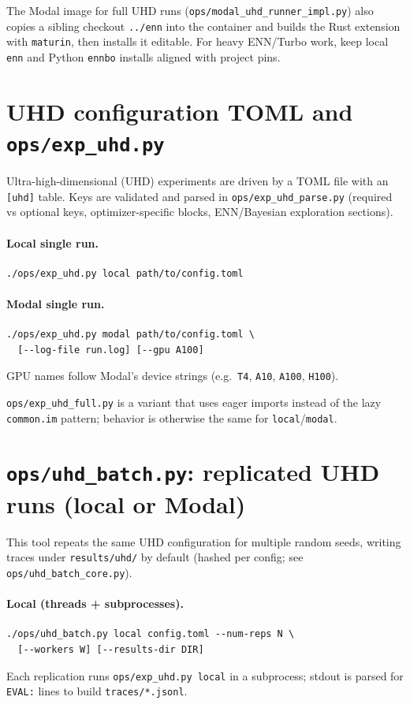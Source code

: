 \documentclass[11pt]{article}
\begin{document}
The Modal image for full UHD runs (\texttt{ops/modal\_uhd\_runner\_impl.py}) also copies a sibling checkout \texttt{../enn} into the container and builds the Rust extension with \texttt{maturin}, then installs it editable. For heavy ENN/Turbo work, keep local \texttt{enn} and Python \texttt{ennbo} installs aligned with project pins.

\section{UHD configuration TOML and \texttt{ops/exp\_uhd.py}}
Ultra-high-dimensional (UHD) experiments are driven by a TOML file with an \texttt{[uhd]} table. Keys are validated and parsed in \texttt{ops/exp\_uhd\_parse.py} (required vs optional keys, optimizer-specific blocks, ENN/Bayesian exploration sections).

\paragraph{Local single run.}
\begin{verbatim}
./ops/exp_uhd.py local path/to/config.toml
\end{verbatim}

\paragraph{Modal single run.}
\begin{verbatim}
./ops/exp_uhd.py modal path/to/config.toml \
  [--log-file run.log] [--gpu A100]
\end{verbatim}
GPU names follow Modal's device strings (e.g.\ \texttt{T4}, \texttt{A10}, \texttt{A100}, \texttt{H100}).

\texttt{ops/exp\_uhd\_full.py} is a variant that uses eager imports instead of the lazy \texttt{common.im} pattern; behavior is otherwise the same for \texttt{local}/\texttt{modal}.

\section{\texttt{ops/uhd\_batch.py}: replicated UHD runs (local or Modal)}
This tool repeats the same UHD configuration for multiple random seeds, writing traces under \texttt{results/uhd/} by default (hashed per config; see \texttt{ops/uhd\_batch\_core.py}).

\paragraph{Local (threads + subprocesses).}
\begin{verbatim}
./ops/uhd_batch.py local config.toml --num-reps N \
  [--workers W] [--results-dir DIR]
\end{verbatim}
Each replication runs \texttt{ops/exp\_uhd.py local} in a subprocess; stdout is parsed for \texttt{EVAL:} lines to build \texttt{traces/*.jsonl}.
\end{document}
